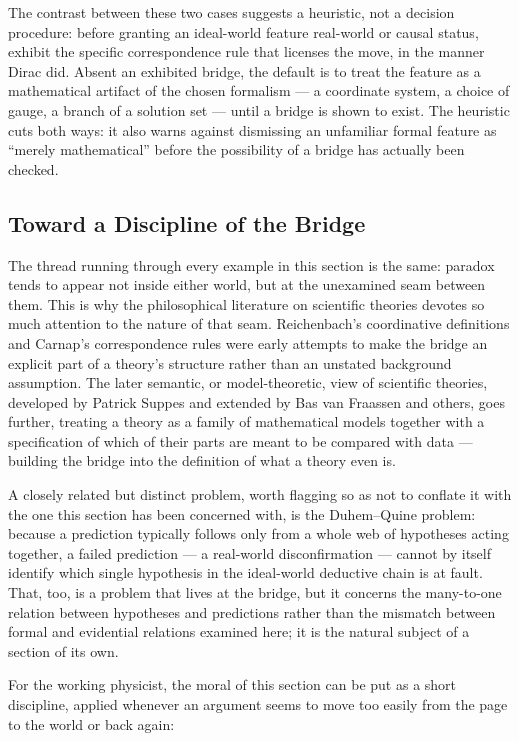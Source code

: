 The contrast between these two cases suggests a heuristic, not a decision
procedure: before granting an ideal-world feature real-world or causal status,
exhibit the specific correspondence rule that licenses the move, in the manner
Dirac did. Absent an exhibited bridge, the default is to treat the feature as a
mathematical artifact of the chosen formalism --- a coordinate system, a choice
of gauge, a branch of a solution set --- until a bridge is shown to exist. The
heuristic cuts both ways: it also warns against dismissing an unfamiliar formal
feature as ``merely mathematical'' before the possibility of a bridge has
actually been checked.

\subsection{Toward a Discipline of the Bridge}

The thread running through every example in this section is the same: paradox
tends to appear not inside either world, but at the unexamined seam between
them. This is why the philosophical literature on scientific theories devotes
so much attention to the nature of that seam. Reichenbach's coordinative
definitions and Carnap's correspondence rules were early attempts to make the
bridge an explicit part of a theory's structure rather than an unstated
background assumption. The later
semantic, or model-theoretic, view of scientific theories, developed by Patrick
Suppes and extended by Bas van Fraassen and others, goes further, treating a
theory as a family of mathematical models together with a specification of
which of their parts are meant to be compared with data --- building the bridge
into the definition of what a theory even is.

A closely related but distinct problem, worth flagging so as not to conflate it
with the one this section has been concerned with, is the Duhem--Quine problem:
because a prediction typically follows only from a whole web of hypotheses
acting together, a failed prediction --- a real-world disconfirmation ---
cannot by itself identify which single hypothesis in the ideal-world deductive
chain is at fault. That, too, is a problem that lives at
the bridge, but it concerns the many-to-one relation between hypotheses and
predictions rather than the mismatch between formal and evidential relations
examined here; it is the natural subject of a section of its own.

For the working physicist, the moral of this section can be put as a short
discipline, applied whenever an argument seems to move too easily from the page
to the world or back again:


